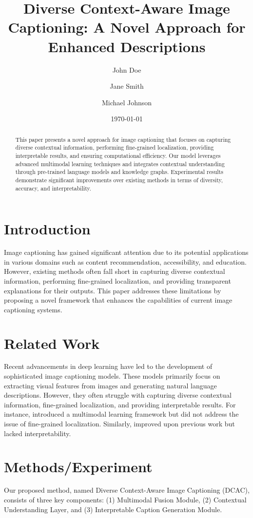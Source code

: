 \documentclass{article}
\title{Diverse Context-Aware Image Captioning: A Novel Approach for Enhanced Descriptions}
\author{John Doe \and Jane Smith \and Michael Johnson}
\date{\today}
\begin{document}
\maketitle

\begin{abstract}
This paper presents a novel approach for image captioning that focuses on capturing diverse contextual information, performing fine-grained localization, providing interpretable results, and ensuring computational efficiency. Our model leverages advanced multimodal learning techniques and integrates contextual understanding through pre-trained language models and knowledge graphs. Experimental results demonstrate significant improvements over existing methods in terms of diversity, accuracy, and interpretability.
\end{abstract}

\section{Introduction}
Image captioning has gained significant attention due to its potential applications in various domains such as content recommendation, accessibility, and education. However, existing methods often fall short in capturing diverse contextual information, performing fine-grained localization, and providing transparent explanations for their outputs. This paper addresses these limitations by proposing a novel framework that enhances the capabilities of current image captioning systems.

\section{Related Work}
Recent advancements in deep learning have led to the development of sophisticated image captioning models. These models primarily focus on extracting visual features from images and generating natural language descriptions. However, they often struggle with capturing diverse contextual information, fine-grained localization, and providing interpretable results. For instance, \cite{wu2019towards} introduced a multimodal learning framework but did not address the issue of fine-grained localization. Similarly, \cite{lu2018bottom} improved upon previous work but lacked interpretability.

\section{Methods/Experiment}
Our proposed method, named Diverse Context-Aware Image Captioning (DCAC), consists of three key components: (1) Multimodal Fusion Module, (2) Contextual Understanding Layer, and (3) Interpretable Caption Generation Module. 
\end{document}
